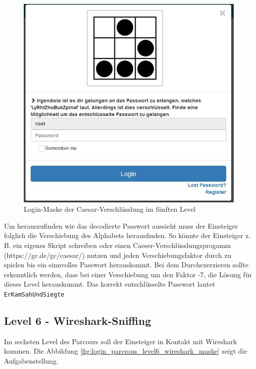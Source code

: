 \begin{figure}[H]
	\centering
	\includegraphics[width=\textwidth]{images/LoginParcours/login_parcrous_level5_caesar_maske.jpg}
	\caption{Login-Maske der Caesar-Verschlüsslung im fünften Level}
	\label{fig:login-parcours-level5-caesar-maske}
\end{figure} 

Um herauszufinden wie das decodierte Passwort aussieht muss der Einsteiger folglich die Verschiebung des Alphabets herausfinden. So könnte der Einsteiger z. B. ein eigenes Skript schreiben oder einen Caeser-Verschlüsslungsprogamm (https://gc.de/gc/caesar/) nutzen und jeden Verschiebungsfaktor durch zu spielen bis ein sinnvolles Passwort herauskommt. Bei dem Durchexerzieren sollte erkenntlich werden, dass bei einer Verschiebung um den Faktor -7, die Lösung für dieses Level herauskommt. Das korrekt entschlüsselte Passwort lautet \colorbox{altgray}{\lstinline|ErKamSahUndSiegte|}

\subsection{Level 6 - Wireshark-Sniffing}
Im sechsten Level des Parcours soll der Einsteiger in Kontakt mit Wireshark kommen. Die Abbildung \ref{fig:login_parcrous_level6_wireshark_maske} zeigt die Aufgabenstellung. 

